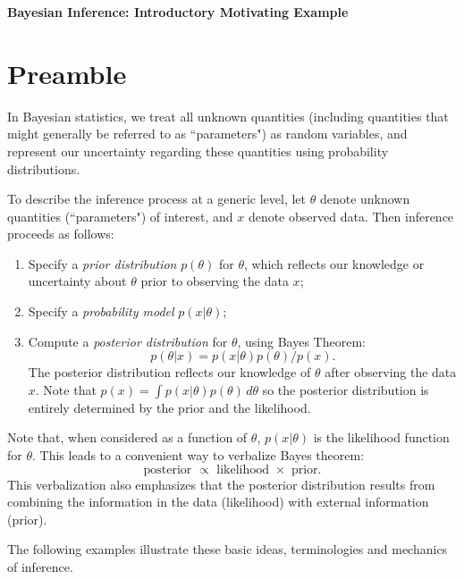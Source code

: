 \documentclass[times,11pt]{article}
\def\data{x}
\begin{document}

\begin{center}
\Large\bf Bayesian Inference: Introductory Motivating Example
\end{center}
\normalsize

\section*{Preamble}

In Bayesian statistics, we treat all unknown quantities (including quantities that might generally be referred to as ``parameters")
as random variables, and represent our uncertainty regarding these quantities using probability distributions. 

To describe the inference process at a generic level, let $\theta$ denote unknown quantities (``parameters") of interest, and $\data$ denote observed data. Then inference proceeds as follows:
\begin{enumerate}
\item Specify a {\it prior distribution} $p(\theta)$ for $\theta$, which reflects our knowledge or uncertainty about
$\theta$ prior to observing the data $\data$;
\item Specify a {\it probability model} $p(\data|\theta)$; 
\item Compute a {\it posterior distribution} for $\theta$, using Bayes Theorem: 
\begin{equation}
p(\theta | \data) = p( \data |\theta) p(\theta)/p( \data).
\end{equation} 
The posterior distribution reflects our knowledge of $\theta$ after observing the data $\data$.
Note that $p(\data) = \int p(\data | \theta) p(\theta) \, d\theta$ so the posterior distribution is entirely determined by the prior and the likelihood.
\end{enumerate}

Note that, when considered as a function of $\theta$, $p(\data|\theta)$ is the likelihood function for $\theta$. This leads to a convenient way to verbalize Bayes theorem:  \begin{equation}
\text{posterior $\propto$ likelihood $\times$ prior.}
\end{equation}
This verbalization also emphasizes that the posterior distribution results from combining the information in the data (likelihood) with external information (prior).

The following examples illustrate these basic ideas, terminologies and mechanics of inference.
\end{document}
